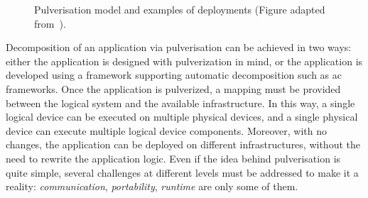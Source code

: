\documentclass[12pt]{article}
\begin{document}
\begin{figure}
\begin{minipage}{\columnwidth}
\begin{minipage}{0.48\columnwidth}
	\end{minipage}
	\end{minipage}
	
	\caption{Pulverisation model and examples of deployments (Figure adapted from~\cite{DBLP:journals/fi/CasadeiPPVW20}).}
	\label{fig:pulv}
\end{figure}
%
Decomposition of an application via pulverisation can be achieved in two ways:
either the application is designed with pulverization in mind,
or the application is developed using a framework supporting automatic decomposition such as \ac{ac} frameworks.
%
Once the application is pulverized,
a mapping must be provided between the logical system and the available infrastructure.
%
In this way,
a single logical device can be executed on multiple physical devices,
and a single physical device can execute multiple logical device components.
%
Moreover,
with no changes,
the application can be deployed on different infrastructures,
without the need to rewrite the application logic.
%
Even if the idea behind pulverisation is quite simple,
several challenges at different levels must be addressed to make it a reality:
\emph{communication}, \emph{portability}, \emph{runtime} are only some of them.
\end{document}
